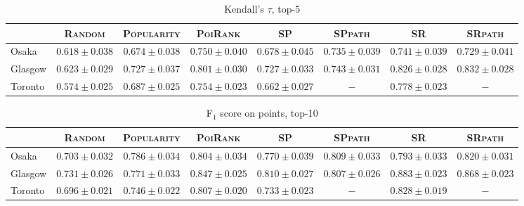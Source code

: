 \begin{table*}[t]
\caption{Kendall's $\tau$, top-5}
\centering
\small
\setlength{\tabcolsep}{4pt} %
\begin{tabular}{l|cc|cc|ccc} \hline
 & \textsc{Random} & \textsc{Popularity} & \textsc{PoiRank} & \textsc{SP} & \textsc{SPpath} & \textsc{SR} & \textsc{SRpath} \\ \hline
Osaka & $0.618\pm0.038$ & $0.674\pm0.038$ & $\mathbf{0.750\pm0.040}$ & $0.678\pm0.045$ & $0.735\pm0.039$ & $\mathit{0.741\pm0.039}$ & $0.729\pm0.041$ \\
Glasgow & $0.623\pm0.029$ & $0.727\pm0.037$ & $0.801\pm0.030$ & $0.727\pm0.033$ & $0.743\pm0.031$ & $\mathit{0.826\pm0.028}$ & $\mathbf{0.832\pm0.028}$ \\
Toronto & $0.574\pm0.025$ & $0.687\pm0.025$ & $\mathit{0.754\pm0.023}$ & $0.662\pm0.027$ & $-$ & $\mathbf{0.778\pm0.023}$ & $-$ \\
\hline
\end{tabular}
\end{table*}

\begin{table*}[t]
\caption{F$_1$ score on points, top-10}
\centering
\small
\setlength{\tabcolsep}{4pt} %
\begin{tabular}{l|cc|cc|ccc} \hline
 & \textsc{Random} & \textsc{Popularity} & \textsc{PoiRank} & \textsc{SP} & \textsc{SPpath} & \textsc{SR} & \textsc{SRpath} \\ \hline
Osaka & $0.703\pm0.032$ & $0.786\pm0.034$ & $0.804\pm0.034$ & $0.770\pm0.039$ & $\mathit{0.809\pm0.033}$ & $0.793\pm0.033$ & $\mathbf{0.820\pm0.031}$ \\
Glasgow & $0.731\pm0.026$ & $0.771\pm0.033$ & $0.847\pm0.025$ & $0.810\pm0.027$ & $0.807\pm0.026$ & $\mathbf{0.883\pm0.023}$ & $\mathit{0.868\pm0.023}$ \\
Toronto & $0.696\pm0.021$ & $0.746\pm0.022$ & $\mathit{0.807\pm0.020}$ & $0.733\pm0.023$ & $-$ & $\mathbf{0.828\pm0.019}$ & $-$ \\
\hline
\end{tabular}
\end{table*}

